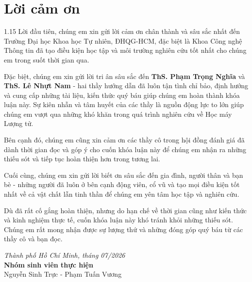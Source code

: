 \chapter*{Lời cảm ơn}
\label{thanks}

\begin{spacing}{1.15}
Lời đầu tiên, chúng em xin gửi lời cảm ơn chân thành và sâu sắc nhất đến Trường Đại học Khoa học Tự nhiên, ĐHQG-HCM, đặc biệt là Khoa Công nghệ Thông tin đã tạo điều kiện học tập và môi trường nghiên cứu tốt nhất cho chúng em trong suốt thời gian qua.

Đặc biệt, chúng em xin gửi lời tri ân sâu sắc đến \textbf{ThS. Phạm Trọng Nghĩa} và \textbf{ThS. Lê Nhựt Nam} - hai thầy hướng dẫn đã luôn tận tình chỉ bảo, định hướng và cung cấp những tài liệu, kiến thức quý báu giúp chúng em hoàn thành khóa luận này. Sự kiên nhẫn và tâm huyết của các thầy là nguồn động lực to lớn giúp chúng em vượt qua những khó khăn trong quá trình nghiên cứu về Học máy Lượng tử.

Bên cạnh đó, chúng em cũng xin cảm ơn các thầy cô trong hội đồng đánh giá đã dành thời gian đọc và góp ý cho cuốn khóa luận này để chúng em nhận ra những thiếu sót và tiếp tục hoàn thiện hơn trong tương lai.

Cuối cùng, chúng em xin gửi lời biết ơn sâu sắc đến gia đình, người thân và bạn bè - những người đã luôn ở bên cạnh động viên, cổ vũ và tạo mọi điều kiện tốt nhất về cả vật chất lẫn tinh thần để chúng em yên tâm học tập và nghiên cứu.

Dù đã rất cố gắng hoàn thiện, nhưng do hạn chế về thời gian cũng như kiến thức và kinh nghiệm thực tế, cuốn khóa luận này khó tránh khỏi những thiếu sót. Chúng em rất mong nhận được sự lượng thứ và những đóng góp quý báu từ các thầy cô và bạn đọc.

\vspace{0.4cm}
\begin{flushright}
\textit{Thành phố Hồ Chí Minh, tháng 07/2026}\\
\textbf{Nhóm sinh viên thực hiện}\\
Nguyễn Sinh Trực - Phạm Tuấn Vương
\end{flushright}
\end{spacing}
